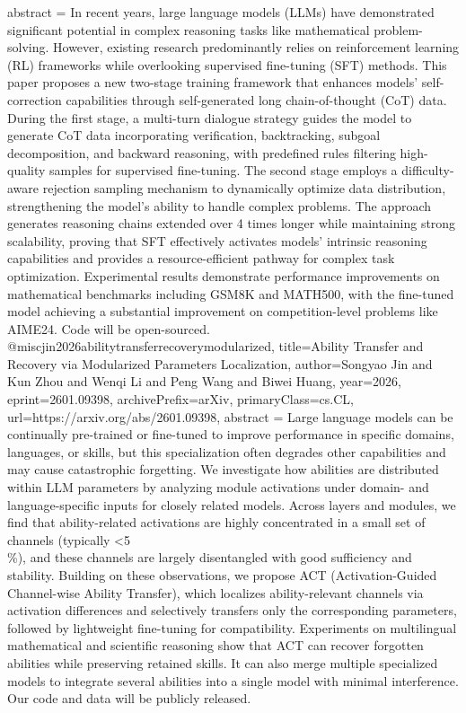 {      abstract = {In recent years, large language models (LLMs) have demonstrated significant potential in complex reasoning tasks like mathematical problem-solving. However, existing research predominantly relies on reinforcement learning (RL) frameworks while overlooking supervised fine-tuning (SFT) methods. This paper proposes a new two-stage training framework that enhances models' self-correction capabilities through self-generated long chain-of-thought (CoT) data. During the first stage, a multi-turn dialogue strategy guides the model to generate CoT data incorporating verification, backtracking, subgoal decomposition, and backward reasoning, with predefined rules filtering high-quality samples for supervised fine-tuning. The second stage employs a difficulty-aware rejection sampling mechanism to dynamically optimize data distribution, strengthening the model's ability to handle complex problems. The approach generates reasoning chains extended over 4 times longer while maintaining strong scalability, proving that SFT effectively activates models' intrinsic reasoning capabilities and provides a resource-efficient pathway for complex task optimization. Experimental results demonstrate performance improvements on mathematical benchmarks including GSM8K and MATH500, with the fine-tuned model achieving a substantial improvement on competition-level problems like AIME24. Code will be open-sourced.}
}@misc{jin2026abilitytransferrecoverymodularized,
      title={Ability Transfer and Recovery via Modularized Parameters Localization}, 
      author={Songyao Jin and Kun Zhou and Wenqi Li and Peng Wang and Biwei Huang},
      year={2026},
      eprint={2601.09398},
      archivePrefix={arXiv},
      primaryClass={cs.CL},
      url={https://arxiv.org/abs/2601.09398},
      abstract = {Large language models can be continually pre-trained or fine-tuned to improve performance in specific domains, languages, or skills, but this specialization often degrades other capabilities and may cause catastrophic forgetting. We investigate how abilities are distributed within LLM parameters by analyzing module activations under domain- and language-specific inputs for closely related models. Across layers and modules, we find that ability-related activations are highly concentrated in a small set of channels (typically <5\\\%), and these channels are largely disentangled with good sufficiency and stability. Building on these observations, we propose ACT (Activation-Guided Channel-wise Ability Transfer), which localizes ability-relevant channels via activation differences and selectively transfers only the corresponding parameters, followed by lightweight fine-tuning for compatibility. Experiments on multilingual mathematical and scientific reasoning show that ACT can recover forgotten abilities while preserving retained skills. It can also merge multiple specialized models to integrate several abilities into a single model with minimal interference. Our code and data will be publicly released.}
}

